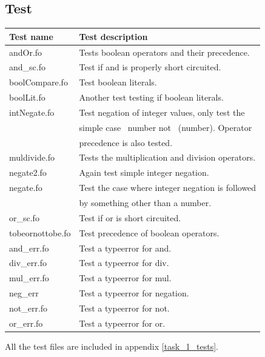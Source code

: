 \documentclass[11pt]{article}
\begin{document}
    \subsection{Test}
    \begin{tabular}{|l|l|}
        \hline
        \textbf{Test name} & \textbf{Test description}                        \\
        \hline
        andOr.fo           & Tests boolean operators and their precedence.    \\
        \hline
        and\_sc.fo         & Test if and is properly short circuited.         \\
        \hline
        boolCompare.fo     & Test boolean literals.                           \\
        \hline
        boolLit.fo         & Another test testing if boolean literals.        \\
        \hline
        intNegate.fo       & Test negation of integer values, only test the   \\
                           & simple case ~number not ~(number).  Operator     \\
                           & precedence is also tested.                       \\
        \hline
        muldivide.fo       & Tests the multiplication and division operators. \\
        \hline
        negate2.fo         & Again test simple integer negation.              \\
        \hline
        negate.fo          & Test the case where integer negation is followed \\
                           & by something other than a number.                \\
        \hline
        or\_sc.fo          & Test if or is short circuited.                   \\
        \hline
        tobeornottobe.fo   & Test precedence of boolean operators.            \\
        \hline
        and\_err.fo        & Test a typeerror for and.                        \\
        \hline
        div\_err.fo        & Test a typeerror for div.                        \\
        \hline
        mul\_err.fo        & Test a typeerror for mul.                        \\
        \hline
        neg\_err           & Test a typeerror for negation.                   \\
        \hline
        not\_err.fo        & Test a typeerror for not.                        \\
        \hline
        or\_err.fo         & Test a typeerror for or.                         \\
        \hline
    \end{tabular}

    All the test files are included in appendix \ref{task_1_tests}.
\end{document}
